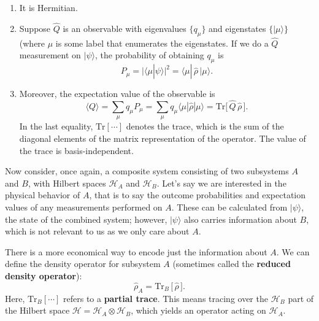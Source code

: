 \documentclass[pra,12pt]{revtex4}
\begin{document}
\begin{enumerate}
\item It is Hermitian.  

\item Suppose $\hat{Q}$ is an observable with eigenvalues $\{q_\mu\}$
  and eigenstates $\{|\mu\rangle\}$ (where $\mu$ is some label that
  enumerates the eigenstates.  If we do a $\hat{Q}$ measurement on
  $|\psi\rangle$, the probability of obtaining $q_\mu$ is
  \begin{equation}
    P_\mu = \big|\langle \mu | \psi\rangle\big|^2 =
    \langle \mu |\, \hat{\rho}\, | \mu \rangle.
    \label{Pi_rho}
  \end{equation}

\item Moreover, the expectation value of the observable is
  \begin{equation}
    \langle Q\rangle
    = \sum_\mu q_\mu P_\mu
    = \sum_\mu q_\mu \langle \mu | \hat{\rho}| \mu \rangle
    = \mathrm{Tr}\big[\,\hat{Q} \, \hat{\rho}\,\big].
    \label{Qexpt}
  \end{equation}
  In the last equality, $\mathrm{Tr}[\cdots]$ denotes the trace, which
  is the sum of the diagonal elements of the matrix representation of
  the operator.  The value of the trace is basis-independent.
\end{enumerate}

Now consider, once again, a composite system consisting of two
subsystems $A$ and $B$, with Hilbert spaces $\mathscr{H}_A$ and
$\mathscr{H}_B$.  Let's say we are interested in the physical behavior
of $A$, that is to say the outcome probabilities and expectation
values of any measurements performed on $A$.  These can be calculated
from $|\psi\rangle$, the state of the combined system; however,
$|\psi\rangle$ also carries information about $B$, which is not
relevant to us as we only care about $A$.

There is a more economical way to encode just the information about
$A$.  We can define the density operator for subsystem $A$ (sometimes
called the \textbf{reduced density operator}):
\begin{equation}
  \hat{\rho}_A = \mathrm{Tr}_B \,\big[\,\hat{\rho}\,\big].
  \label{rhoa_def}
\end{equation}
Here, $\mathrm{Tr}_B[\cdots]$ refers to a \textbf{partial trace}.
This means tracing over the $\mathscr{H}_B$ part of the Hilbert space
$\mathscr{H} = \mathscr{H}_A \otimes \mathscr{H}_B$, which yields an
operator acting on $\mathscr{H}_A$.
\end{document}
